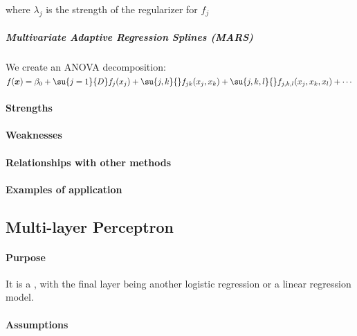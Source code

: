  where $\lambda_{j}$ is the strength of the regularizer for $f_{j}$
\subparagraph{Multivariate Adaptive Regression Splines (MARS)}
We create an ANOVA decomposition:
$f(\bm{x}) = \beta_{0} + \su{j=1}{D}f_{j}(x_{j}) + \su{j,k}{}f_{jk}(x_{j},x_{k}) + 
\su{j,k,l}{}f_{j,k,l}(x_{j}, x_{k}, x_{l}) + \cdots$
\paragraph{Strengths}
\paragraph{Weaknesses}
\paragraph{Relationships with other methods}
\paragraph{Examples of application}


\subsection{Multi-layer Perceptron}
\paragraph{Purpose}
It is a , with the final layer
being another logistic regression or a linear regression model.

\paragraph{Assumptions}
